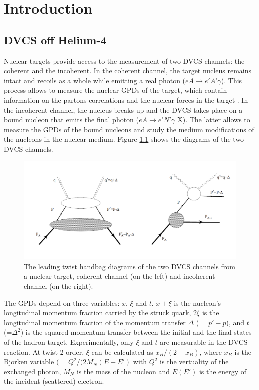 \chapter{Introduction} \label{Nuclear_DVCS}
\section{DVCS off Helium-4} \label{Nuclear_DVCS}
Nuclear targets provide access to the measurement of two DVCS channels: the coherent and the incoherent. In the coherent channel, the target nucleus remains intact and recoils as a whole while emitting a real photon ($eA \rightarrow e' A' \gamma$). This process allows to measure the nuclear GPDs of the target, which contain information on the partons correlations and the nuclear forces in the target \cite{M_Polyakov,EMC_simonetta}. In the incoherent channel, the nucleus breaks up and the DVCS takes place on a bound nucleon that emits the final photon ($eA \rightarrow e' N' \gamma$ X). The latter allows to measure the GPDs of the bound nucleons and study the medium modifications of the nucleons in the nuclear medium. Figure \ref{fig:nuclear_DVCS} shows the diagrams of the two DVCS channels. 
\begin{figure}[tbp]
\centering
\includegraphics[scale=0.3]{fig/nuclear_DVCS.png}
\caption{The leading twist handbag diagrams of the two DVCS channels from a nuclear target, coherent channel (on the left) and incoherent channel (on the right). } 
\label{fig:nuclear_DVCS}
\end{figure}

The GPDs depend on three variables: $x$, $\xi$ and $t$. $x+\xi$ is the 
nucleon's longitudinal momentum fraction carried by the struck quark, 2$\xi$ is 
the longitudinal momentum fraction of the momentum transfer $\Delta$ ($= p' - 
p$), and $t$ (=$\Delta^{2}$) is the squared momentum transfer between the 
initial and the final states of the hadron target. Experimentally, only $\xi$ 
and $t$ are measurable in the DVCS reaction. At twist-2 order, $\xi$ can be 
calculated as $x_B/(2-x_B)$, where $x_B$ is the Bjorken variable $(= 
Q^{2}/(2M_{N}(E-E')$ with $Q^2$ is the vertuality of the exchanged photon, 
$M_{N}$ is the mass of the nucleon and $E(E')$ is the energy of the incident 
(scattered) electron.

